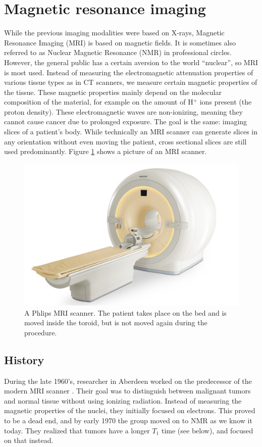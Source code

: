 \section{Magnetic resonance imaging}
While the previous imaging modalities were based on X-rays, Magnetic Resonance
Imaging (MRI) is based on magnetic fields. It is sometimes also referred to as
Nuclear Magnetic Resonance (NMR) in professional circles. However, the general
public has a certain aversion to the world ``nuclear'', so MRI is most used.
Instead of measuring the electromagnetic attenuation properties of various
tissue types as in CT scanners, we measure certain magnetic properties of the
tissue. These magnetic properties mainly depend on the molecular composition of
the material, for example on the amount of H$^+$ ions present (the proton
density). These electromagnetic waves are non-ionizing, meaning they cannot
cause cancer due to prolonged exposure. The goal is the same: imaging slices of
a patient's body. While technically an MRI scanner can generate slices in any
orientation without even moving the patient, cross sectional slices are still
used predominantly. Figure \ref{fig:mriscanner} shows a picture of an MRI
scanner.

\begin{figure}[ht]
\begin{center}
  \includegraphics[width=\linewidth]{img/mriscanner.jpg}
  \caption{A Phlips MRI scanner. The patient takes place on the bed and is
  moved inside the toroid, but is not moved again during the procedure.}
  \label{fig:mriscanner}
\end{center}
\end{figure}

\subsection{History}
During the late 1960's, researcher in Aberdeen worked on the predecessor of the
modern MRI scanner \cite{mrihistory}. Their goal was to distinguish between
malignant tumors and normal tissue without using ionizing radiation. Instead of
measuring the magnetic properties of the nuclei, they initially focused on
electrons. This proved to be a dead end, and by early 1970 the group moved on to
NMR as we know it today. They realized that tumors have a longer $T_1$ time
(see below), and focused on that instead.

